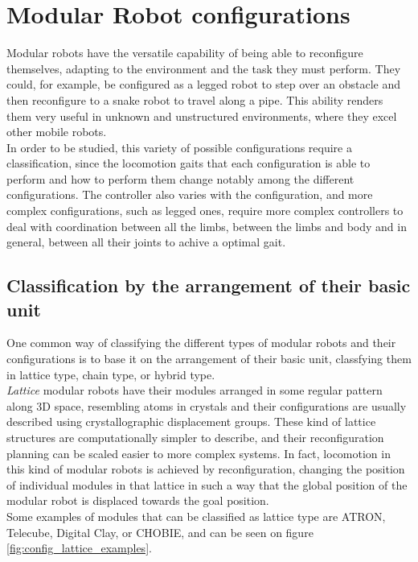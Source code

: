 \section{Modular Robot configurations}
\label{config}

Modular robots have the versatile capability of being able to reconfigure themselves, adapting to the environment and the task they must perform. They could, for example, be configured as a legged robot to step over an obstacle and then reconfigure to a snake robot to travel along a pipe. This ability renders them very useful in unknown and unstructured environments, where they excel other mobile robots.\\

In order to be studied, this variety of possible configurations require a classification, since the locomotion gaits that each configuration is able to perform and how to perform them change notably among the different configurations. The controller also varies with the configuration, and more complex configurations, such as legged ones, require more complex controllers to deal with coordination between all the limbs, between the limbs and body and in general, between all their joints to achive a optimal gait.\\

\subsection{Classification by the arrangement of their basic unit}
\label{config_basic_unit}
One common way of classifying the different types of modular robots and their configurations is to base it on the arrangement of their basic unit, classfying them in lattice type, chain type, or hybrid type.\\

\emph{Lattice} modular robots have their modules arranged in some regular pattern along 3D space, resembling atoms in crystals and their configurations are usually described using crystallographic displacement groups. These kind of lattice structures are computationally simpler to describe, and their reconfiguration planning can be scaled easier to more complex systems. In fact, locomotion in this kind of modular robots is achieved by reconfiguration, changing the position of individual modules in that lattice in such a way that the global position of the modular robot is displaced towards the goal position. 
\\

Some examples of modules that can be classified as lattice type are ATRON, Telecube, Digital Clay, or CHOBIE, and can be seen on figure \ref{fig:config_lattice_examples}.\\

